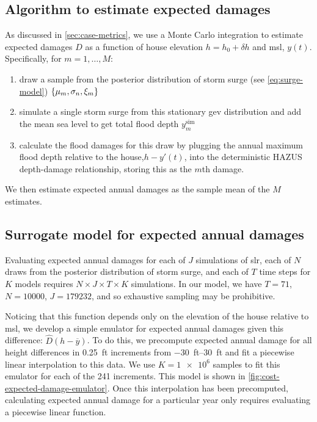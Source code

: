 \documentclass[11pt]{article}
\begin{document}
\subsection{Algorithm to estimate expected damages}\label{sec:alg-ead}

As discussed in \cref{sec:case-metrics}, we use a Monte Carlo integration to estimate expected damages $D$ as a function of house elevation $h = h_0 + \delta h$ and \gls{msl}, $y(t)$.
Specifically, for $m=1, \ldots, M$:
\begin{enumerate}
    \item draw a sample from the posterior distribution of storm surge (see \cref{eq:surge-model})  $\qty{ \mu_m, \sigma_n, \xi_m}$
    \item simulate a single storm surge from this stationary \gls{gev} distribution and add the mean sea level to get total flood depth $y^\mathrm{sim}_m$
    \item calculate the flood damages for this draw by plugging the annual maximum flood depth relative to the house,$h - y'(t)$, into  the deterministic HAZUS depth-damage relationship, storing this as the $m$th damage.
\end{enumerate}
We then estimate expected annual damages as the sample mean of the $M$ estimates.

\subsection{Surrogate model for expected annual damages}\label{sec:surrogate-ead}
Evaluating expected annual damages for each of $J$ simulations of \gls{slr}, each of $N$ draws from the posterior distribution of storm surge, and each of $T$ time steps for $K$ models requires $N \times J \times T \times K$ simulations.
In our model, we have $T=71$, $N=\num{10000}$, $J=\num{179232}$, and so exhaustive sampling may be prohibitive.

Noticing that this function depends only on the elevation of the house relative to \gls{msl}, we develop a simple emulator for expected annual damages given this difference: $\hat{D}(h - \overline{y})$.
To do this, we  precompute expected annual damage for all height differences in \SI{0.25}{ft} increments from \SIrange{-30}{30}{ft} and fit a piecewise linear interpolation to this data.
We use $K=\num{1e6}$ samples to fit this emulator for each of the 241 increments.
This model is shown in \cref{fig:cost-expected-damage-emulator}.
Once this interpolation has been precomputed, calculating expected annual damage for a particular year only requires evaluating a piecewise linear function.
\end{document}
